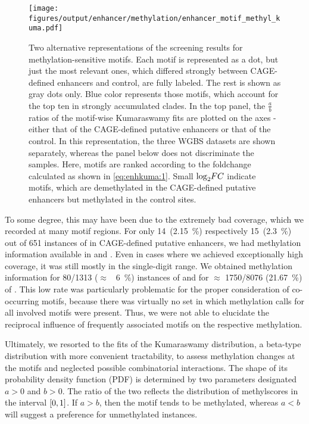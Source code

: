 \begin{figure}[!htb]
	\centering
	\texttt{[image: figures/output/enhancer/methylation/enhancer\_motif\_methyl\_kuma.pdf]} 
	\caption{Two alternative representations of the screening results for methylation-sensitive motifs. Each motif is represented as a dot, but just the most relevant ones, which differed strongly between CAGE-defined enhancers and control, are fully labeled. The rest is shown as gray dots only. Blue color represents those motifs, which account for the top ten in strongly accumulated clades. In the top panel, the $\frac{a}{b}$ ratios of the motif-wise Kumaraswamy fits are plotted on the axes - either that of the CAGE-defined putative enhancers or that of the control. In this representation, the three WGBS datasets are shown separately, whereas the panel below does not discriminate the samples. Here, motifs are ranked according to the foldchange calculated as shown in \autoref{eq:enhkuma:1}. Small $\log_2\hspace{-0.2em}FC$ indicate motifs, which are demethylated in the CAGE-defined putative enhancers but methylated in the control sites.}
	\label{fig:enhancers:motifs:enhancer_motif_methyl_kuma}
\end{figure}

To some degree, this may have been due to the extremely bad coverage, which we recorded at many motif regions. For only \num{14}~(\SI{2.15}{\percent}) respectively \num{15}~(\SI{2.3}{\percent}) out of \num{651} instances of \motifetsone in CAGE-defined putative enhancers, we had methylation information available in \dnmtwt and \dnmtchip. Even in cases where we achieved exceptionally high coverage, it was still mostly in the single-digit range. We obtained methylation information for \num{80}/\num{1313} (\ensuremath{\approx} ~\SI{6}{\percent}) instances of \motifcebpb and for \ensuremath{\approx} \num{1750}/\num{8076} (\SI{21.67}{\percent}) of \motifmlltwo. This low rate was particularly problematic for the proper consideration of co-occurring motifs, because there was virtually no set in which methylation calls for all involved motifs were present. Thus, we were not able to elucidate the reciprocal influence of frequently associated motifs on the respective methylation. 

Ultimately, we resorted to the fits of the Kumaraswamy distribution\cite{Kumaraswamy1980,Jones2009}, a beta-type distribution with more convenient tractability, to assess methylation changes at the motifs and neglected possible combinatorial interactions. The shape of its probability density function (PDF) is determined by two parameters designated $a > 0$ and $b >0 $. The ratio of the two reflects the distribution of methylscores in the interval $\interval{0}{1}$. If $a > b$, then the motif tends to be methylated, whereas $a < b$ will suggest a preference for unmethylated instances. 

